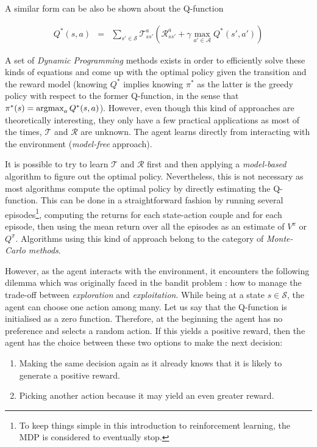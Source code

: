 			A similar form can be also be shown about the Q-function
							
				\begin{eqnarray}
					Q^*(s,a) & = & \sum_{s' \in \mathcal{S}} \mathscr{T}_{ss'}^a (\mathscr{R}_{ss'}^a + \gamma \max_{a' \in \mathcal{A}} Q^*(s',a')) \label{eq:qbellmanoptim}
				\end{eqnarray}

			A set of \textit{Dynamic Programming} methods exists in order to efficiently solve these kinds of equations and come up with the optimal policy given the transition and the reward model (knowing $Q^*$ implies knowing $\pi^*$ as the latter is the greedy policy with respect to the former Q-function, in the sense that $\pi^*(s) = \mathop{\hbox{argmax}}_a Q^*(s,a)$). However, even though this kind of approaches are theoretically interesting, they only have a few practical applications as most of the times, $\mathscr{T}$ and $\mathscr{R}$ are unknown. The agent learns directly from interacting with the environment (\textit{model-free} approach).
			
			It is possible to try to learn $\mathscr{T}$ and $\mathscr{R}$ first and then applying a \textit{model-based} algorithm to figure out the optimal policy. Nevertheless, this is not necessary as most algorithms compute the optimal policy by directly estimating the Q-function. This can be done in a straightforward fashion by running several episodes\footnote{To keep things simple in this introduction to reinforcement learning, the MDP is considered to eventually stop.}, computing the returns for each state-action couple and for each episode, then using the mean return over all the episodes as an estimate of $V^\pi$ or $Q^\pi$. Algorithms using this kind of approach belong to the category of \textit{Monte-Carlo methods}.
			
			However, as the agent interacts with the environment, it encounters the following dilemma which was originally faced in the bandit problem \cite{Berry1985,Bubeck2012}: how to manage the trade-off between \textit{exploration} and \textit{exploitation}. While being at a state $s \in \mathcal{S}$, the agent can choose one action among many. Let us say that the Q-function is initialised as a zero function. Therefore, at the beginning the agent has no preference and selects a random action. If this yields a positive reward, then the agent has the choice between these two options to make the next decision:
			
			\begin{enumerate}
				\item Making the same decision again as it already knows that it is likely to generate a positive reward.
				\item Picking another action because it may yield an even greater reward.
			\end{enumerate}
			
